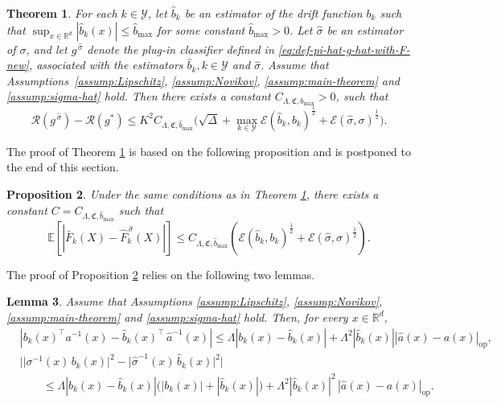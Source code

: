 \documentclass{article}
\theoremstyle{plain}
\newtheorem{theorem}{Theorem}[section]
\newtheorem{proposition}[theorem]{Proposition}
\newtheorem{lemma}[theorem]{Lemma}
\theoremstyle{definition}
\theoremstyle{remark}
\newcommand{\RD}{\mathbb{R}^{d}}
\newcommand{\EE}{\mathbb{E}}
\newcommand{\calY}{\mathcal{Y}}
\newcommand{\calR}{\mathcal{R}}
\newcommand{\calE}{\mathcal{E}}
\begin{document}
\begin{theorem}\label{thm:main-decomposition-sigma-unknown}
For each \( k \in \mathcal Y \), let \( \widehat b_k \) be an estimator of the drift function \( b_k \) such that 
$\sup_{x\in\RD} |\widehat b_k(x)|\leq \widehat b_{\max}$ for some constant $\widehat b_{\max}>0$.  Let \(\widehat\sigma\) be an estimator of \(\sigma\), and let \(g^{\,\widehat\sigma}\) denote the plug-in classifier defined in \eqref{eq:def-pi-hat-g-hat-with-F-new}, associated with the estimators \(\widehat b_k, {k\in\calY}\) and \(\widehat\sigma\). Assume that Assumptions~\ref{assump:Lipschitz}, \ref{assump:Novikov}, \ref{assump:main-theorem} and \ref{assump:sigma-hat} hold.
Then there exists a constant \( C_{\Lambda, \mathfrak{C}, b_{\max}} > 0 \), such that
\begin{equation}\label{eq:inequality-in-main-thm-with-sigma-hat}
    \calR(g^{\,\widehat{\sigma}})-\mathcal{R}(g^*)\leq K^2 C_{\Lambda, \mathfrak{C}, \widehat b_{\max}}\big(\sqrt{\Delta} + \max_{k\in\calY}\calE(\widehat b_k, b_k)^{\frac{1}{2}}+\mathcal{E}(\widehat\sigma,\sigma)^{\frac{1}{2}}\big).
\end{equation}
\end{theorem}

The proof of Theorem \ref{thm:main-decomposition-sigma-unknown} is based on the following proposition and is postponed to the end of this section.

\begin{proposition}\label{prop:error-F-hat-new}
Under the same conditions as in Theorem \ref{thm:main-decomposition-sigma-unknown},  there exists a  constant \(C=C_{\Lambda,\mathfrak C,\widehat b_{\max}}\) such that
\[ \EE \left[ \left|\bar F_k(X)-\widehat F^{\,\widehat{\sigma}}_k(X)\right|\right]\leq C_{\Lambda, \mathfrak{C}, \widehat b_{\max}}\left(\calE(\widehat b_k, b_k)^{\frac{1}{2}}+\mathcal{E}(\widehat\sigma,\sigma)^{\frac{1}{2}}\right).\]
\end{proposition}

The proof of Proposition \ref{prop:error-F-hat-new} relies on the following two lemmas. 


\begin{lemma}\label{lem:sigma-hat-bound}
    Assume that Assumptions \ref{assump:Lipschitz}, \ref{assump:Novikov}, \ref{assump:main-theorem} and \ref{assump:sigma-hat} hold. Then, for every \(x\in\RD\),
\begin{align}
&\left| b_k(x)^{\top}a^{-1}(x)-\widehat b_k(x)^{\top}\,\widehat{a}^{-1}(x)\right|\leq \Lambda |b_k(x)-\widehat b_k(x)|+\Lambda^2|\widehat{b}_k(x)|\left|\widehat{a}(x)-a(x)\right|_{\mathrm{op}},\nonumber\\
&\Big|\big\lvert \sigma^{-1} (x)\,b_k(x) \big\rvert^2-\big\lvert \widehat{\sigma}^{-1} (x)\,\widehat{b}_k(x) \big\rvert^2\Big|\nonumber\\
&\qquad \leq \Lambda |b_k(x)-\widehat b_k(x)|\bigl(|b_k(x)|+|\widehat b_k(x)|\bigr)+\Lambda^2 |\widehat{b}_k(x)|^2\,|\widehat a(x)-a(x)|_{\mathrm{op}}.\nonumber
\end{align}
\end{lemma}
\end{document}

